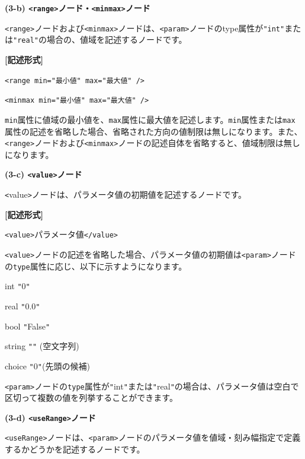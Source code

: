 \documentclass[a4paper,11pt]{jarticle}
\begin{document}
{\vspace{12pt}
\textbf{(3-b) \texttt{<range>}ノード・\texttt{<minmax>}ノード}

\texttt{<range>}ノードおよび\texttt{<minmax>}ノードは、\texttt{<param>}ノードのtype属性が\texttt{"int"}または\texttt{"real"}の場合の、値域を記述するノードです。

\vspace{8pt}
\leftskip=12pt
\textbf{[記述形式]}

\leftskip=42pt
\texttt{<range  min="最小値"  max="最大値" />}

\texttt{<minmax  min="最小値"  max="最大値" />}

\vspace{8pt}
\leftskip=0pt
{\tt min}属性に値域の最小値を、{\tt max}属性に最大値を記述します。{\tt min}属性または{\tt max}属性の記述を省略した場合、省略された方向の値制限は無しになります。また、\texttt{<range>}ノードおよび\texttt{<minmax>}ノードの記述自体を省略すると、値域制限は無しになります。

\vspace{12pt}
\textbf{(3-c) \texttt{<value>}ノード}

\texttt{<}value\texttt{>}ノードは、パラメータ値の初期値を記述するノードです。

\vspace{8pt}
\leftskip=12pt
\textbf{[記述形式]}

\leftskip=42pt
\texttt{<value>}パラメータ値\texttt{</value>}

\vspace{8pt}
\leftskip=0pt
\texttt{<value>}ノードの記述を省略した場合、パラメータ値の初期値は\texttt{<param>}ノードの{\tt type}属性に応じ、以下に示すようになります。

\parindent=18pt
int \texttt{"}0\texttt{"}

real \texttt{"}0.0\texttt{"}

bool \texttt{"}False\texttt{"}

string \texttt{"}\texttt{"} (空文字列)

choice \texttt{"}0\texttt{"}(先頭の候補)

\parindent=0pt
\texttt{<param>}ノードの{\tt type}属性が\texttt{"}int\texttt{"}または\texttt{"}real\texttt{"}の場合は、パラメータ値は空白で区切って複数の値を列挙することができます。

\vspace{12pt}
\textbf{(3-d) \texttt{<useRange>}ノード}

\texttt{<useRange>}ノードは、\texttt{<param>}ノードのパラメータ値を値域・刻み幅指定で定義するかどうかを記述するノードです。

}
\end{document}
